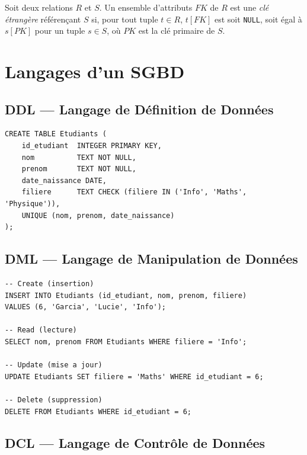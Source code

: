 \begin{definition}
Soit deux relations $R$ et $S$. Un ensemble d'attributs $FK$ de $R$ est une
\emph{cl\'e \'etrang\`ere} r\'ef\'eren\c{c}ant $S$ si, pour tout tuple $t \in R$,
$t[FK]$ est soit \texttt{NULL}, soit \'egal \`a $s[PK]$ pour un tuple $s \in S$,
o\`u $PK$ est la cl\'e primaire de $S$.
\end{definition}

\section{Langages d'un SGBD}

\subsection{DDL --- Langage de D\'efinition de Donn\'ees}

\begin{codeblock}[title=\textbf{Cr\'eation d'une table avec contraintes}]
\begin{verbatim}
CREATE TABLE Etudiants (
    id_etudiant  INTEGER PRIMARY KEY,
    nom          TEXT NOT NULL,
    prenom       TEXT NOT NULL,
    date_naissance DATE,
    filiere      TEXT CHECK (filiere IN ('Info', 'Maths', 'Physique')),
    UNIQUE (nom, prenom, date_naissance)
);
\end{verbatim}
\end{codeblock}

\subsection{DML --- Langage de Manipulation de Donn\'ees}

\begin{codeblock}[title=\textbf{Op\'erations CRUD de base}]
\begin{verbatim}
-- Create (insertion)
INSERT INTO Etudiants (id_etudiant, nom, prenom, filiere)
VALUES (6, 'Garcia', 'Lucie', 'Info');

-- Read (lecture)
SELECT nom, prenom FROM Etudiants WHERE filiere = 'Info';

-- Update (mise a jour)
UPDATE Etudiants SET filiere = 'Maths' WHERE id_etudiant = 6;

-- Delete (suppression)
DELETE FROM Etudiants WHERE id_etudiant = 6;
\end{verbatim}
\end{codeblock}

\subsection{DCL --- Langage de Contr\^ole de Donn\'ees}

